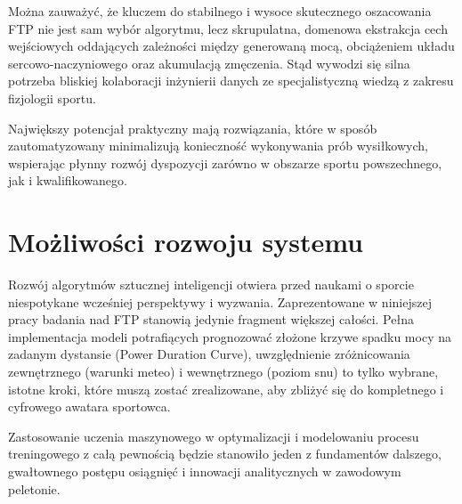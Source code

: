 Można zauważyć, że kluczem do stabilnego i wysoce skutecznego oszacowania FTP nie jest sam wybór algorytmu, lecz skrupulatna, domenowa ekstrakcja cech wejściowych oddających zależności między generowaną mocą, obciążeniem układu sercowo-naczyniowego oraz akumulacją zmęczenia. Stąd wywodzi się silna potrzeba bliskiej kolaboracji inżynierii danych ze specjalistyczną wiedzą z zakresu fizjologii sportu. 

Największy potencjał praktyczny mają rozwiązania, które w sposób zautomatyzowany minimalizują konieczność wykonywania prób wysiłkowych, wspierając płynny rozwój dyspozycji zarówno w obszarze sportu powszechnego, jak i kwalifikowanego.

\section{Możliwości rozwoju systemu}
Rozwój algorytmów sztucznej inteligencji otwiera przed naukami o sporcie niespotykane wcześniej perspektywy i wyzwania. Zaprezentowane w niniejszej pracy badania nad FTP stanowią jedynie fragment większej całości. Pełna implementacja modeli potrafiących prognozować złożone krzywe spadku mocy na zadanym dystansie (Power Duration Curve), uwzględnienie zróżnicowania zewnętrznego (warunki meteo) i wewnętrznego (poziom snu) to tylko wybrane, istotne kroki, które muszą zostać zrealizowane, aby zbliżyć się do kompletnego i cyfrowego awatara sportowca.

Zastosowanie uczenia maszynowego w optymalizacji i modelowaniu procesu treningowego z całą pewnością będzie stanowiło jeden z fundamentów dalszego, gwałtownego postępu osiągnięć i innowacji analitycznych w zawodowym peletonie.